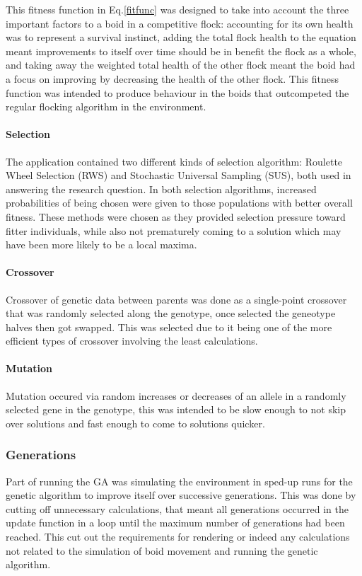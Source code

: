This fitness function in Eq.\ref{fitfunc} was designed to take into account the three important factors to a boid in a competitive flock: accounting for its own health was to represent a survival instinct, adding the total flock health to the equation meant improvements to itself over time should be in benefit the flock as a whole, and taking away the weighted total health of the other flock meant the boid had a focus on improving by decreasing the health of the other flock. This fitness function was intended to produce behaviour in the boids that outcompeted the regular flocking algorithm in the environment.

\paragraph{Selection}
The application contained two different kinds of selection algorithm: Roulette Wheel Selection (RWS) and Stochastic Universal Sampling (SUS), both used in answering the research question. In both selection algorithms, increased probabilities of being chosen were given to those populations with better overall fitness. These methods were chosen as they provided selection pressure toward fitter individuals, while also not prematurely coming to a solution which may have been more likely to be a local maxima. 

\paragraph{Crossover}
Crossover of genetic data between parents was done as a single-point crossover that was randomly selected along the genotype, once selected the geneotype halves then got swapped. This was selected due to it being one of the more efficient types of crossover involving the least calculations.

\paragraph{Mutation}
Mutation occured via random increases or decreases of an allele in a randomly selected gene in the genotype, this was intended to be slow enough to not skip over solutions and fast enough to come to solutions quicker.

\subsubsection{Generations}
Part of running the GA was simulating the environment in sped-up runs for the genetic algorithm to improve itself over successive generations. This was done by cutting off unnecessary calculations, that meant all generations occurred in the update function in a loop until the maximum number of generations had been reached. This cut out the requirements for rendering or indeed any calculations not related to the simulation of boid movement and running the genetic algorithm.

